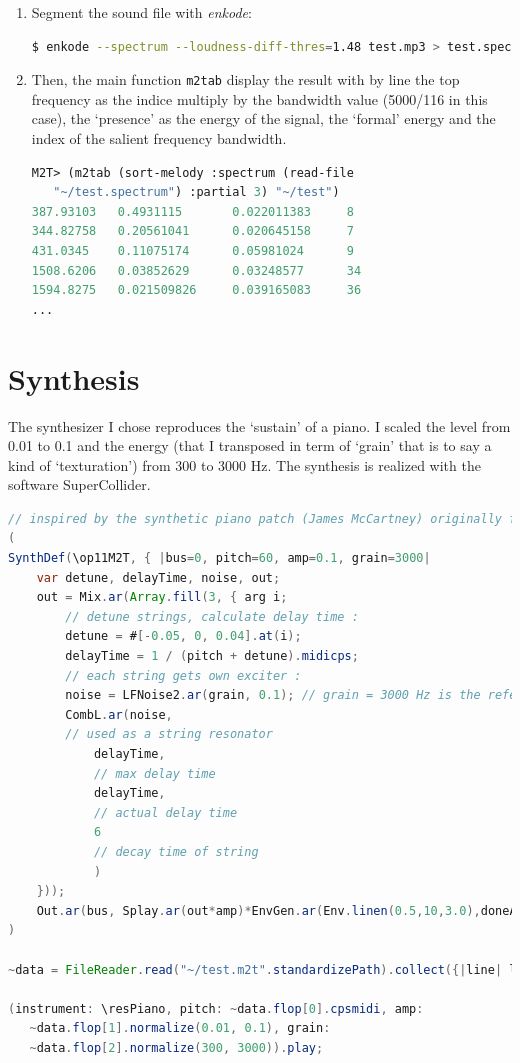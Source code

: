 \begin{enumerate}
\item
Segment the sound file with \textsl{enkode}:
\begin{lstlisting}[language=bash]
$ enkode --spectrum --loudness-diff-thres=1.48 test.mp3 > test.spectrum
\end{lstlisting}

\item
Then, the main function \texttt{m2tab} display the result with by line the top frequency as the indice multiply by the bandwidth value (5000/116 in this case), the `presence' as the energy of the signal, the `formal' energy and the index of the salient frequency bandwidth.   
\begin{lstlisting}[language=Lisp]
M2T> (m2tab (sort-melody :spectrum (read-file 
   "~/test.spectrum") :partial 3) "~/test")
387.93103   0.4931115       0.022011383     8
344.82758   0.20561041      0.020645158     7
431.0345    0.11075174      0.05981024      9
1508.6206   0.03852629      0.03248577      34
1594.8275   0.021509826     0.039165083     36
...
\end{lstlisting}
\end{enumerate}

\section{Synthesis}

The synthesizer I chose reproduces the `sustain' of a piano. I scaled the level from 0.01 to 0.1 and the energy (that I transposed in term of `grain' that is to say a kind of `texturation') from 300 to 3000 Hz. The synthesis is realized with the software SuperCollider.
\newpage
\begin{lstlisting}[language=Java]
// inspired by the synthetic piano patch (James McCartney) originally for SC2, 1998.
(
SynthDef(\op11M2T, { |bus=0, pitch=60, amp=0.1, grain=3000|
	var detune, delayTime, noise, out;
	out = Mix.ar(Array.fill(3, { arg i;
		// detune strings, calculate delay time :
		detune = #[-0.05, 0, 0.04].at(i);
		delayTime = 1 / (pitch + detune).midicps;
		// each string gets own exciter :
		noise = LFNoise2.ar(grain, 0.1); // grain = 3000 Hz is the reference
		CombL.ar(noise,		
		// used as a string resonator
			delayTime, 	
			// max delay time
			delayTime,	
			// actual delay time
			6
			// decay time of string
			)
	}));
	Out.ar(bus, Splay.ar(out*amp)*EnvGen.ar(Env.linen(0.5,10,3.0),doneAction:2))}).add
)

~data = FileReader.read("~/test.m2t".standardizePath).collect({|line| line.collect({|val| val.asFloat})}) 
 
(instrument: \resPiano, pitch: ~data.flop[0].cpsmidi, amp:
   ~data.flop[1].normalize(0.01, 0.1), grain: 
   ~data.flop[2].normalize(300, 3000)).play;
\end{lstlisting}

